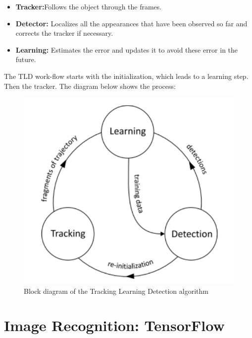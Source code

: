 \begin{itemize}
\setlength{\itemsep}{-10pt}
\item \textbf{Tracker:}Follows the object through the frames.
\item \textbf{Detector:} Localizes all the appearances that have been observed so far and corrects the tracker if necessary.
\item \textbf{Learning:} Estimates the error and updates it to avoid these error in the future.
\end{itemize}

The TLD work-flow starts with the initialization, which leads to a learning step. 
Then the tracker. The diagram below shows the process:

\begin{figure}[h!]
\centering
\includegraphics[scale=0.6]{figures/tld_process.png}
\caption{Block diagram of the Tracking Learning Detection algorithm}
\label{tld_process}
\end{figure}


\section{Image Recognition: TensorFlow}

